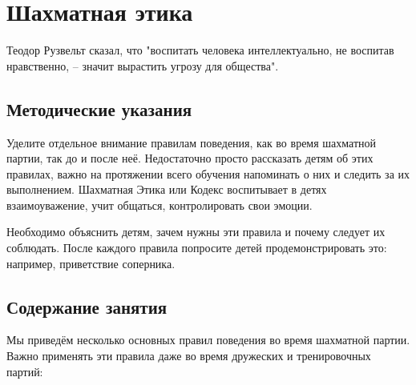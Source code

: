\chapter{Шахматная этика}

Теодор Рузвельт сказал, что "воспитать человека интеллектуально, не воспитав нравственно, -- значит вырастить угрозу для общества".

\section{Методические указания}

Уделите отдельное внимание правилам поведения, как во время шахматной партии, так до и после неё. Недостаточно просто рассказать детям об этих правилах, важно на протяжении всего обучения напоминать о них и следить за их выполнением. Шахматная Этика или Кодекс воспитывает в детях взаимоуважение, учит общаться, контролировать свои эмоции.

Необходимо объяснить детям, зачем нужны эти правила и почему следует их соблюдать. После каждого правила попросите детей продемонстрировать это: например, приветствие соперника. 

\section{Содержание занятия}

Мы приведём несколько основных правил поведения во время шахматной партии. Важно применять эти правила даже во время дружеских и тренировочных партий:

